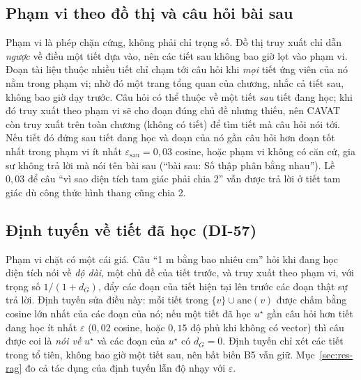 \subsection{Phạm vi theo đồ thị và câu hỏi bài sau}
Phạm vi là phép chặn cứng, không phải chỉ trọng số. Đồ thị truy xuất chỉ dẫn \emph{ngược} về điều một tiết dựa vào, nên các tiết sau không bao giờ lọt vào phạm vi. Đoạn tài liệu thuộc nhiều tiết chỉ chạm tới câu hỏi khi \emph{mọi} tiết ứng viên của nó nằm trong phạm vi; nhờ đó một trang tổng quan của chương, nhắc cả tiết sau, không bao giờ dạy trước. Câu hỏi có thể thuộc về một tiết \emph{sau} tiết đang học; khi đó truy xuất theo phạm vi sẽ cho đoạn đúng chủ đề nhưng thiếu, nên CAVAT còn truy xuất trên toàn chương (không có tiết) để tìm tiết mà câu hỏi nói tới. Nếu tiết đó đứng sau tiết đang học và đoạn của nó gần câu hỏi hơn đoạn tốt nhất trong phạm vi ít nhất $\varepsilon_{\text{sau}}=0{,}03$ cosine, hoặc phạm vi không có căn cứ, gia sư không trả lời mà nói tên bài sau (``bài sau: Số thập phân bằng nhau''). Lề $0{,}03$ để câu ``vì sao diện tích tam giác phải chia 2'' vẫn được trả lời ở tiết tam giác dù công thức hình thang cũng chia 2.

\subsection{Định tuyến về tiết đã học (DI-57)}\label{sec:routing}
Phạm vi chặt có một cái giá. Câu ``1 m bằng bao nhiêu cm'' hỏi khi đang học diện tích nói về \emph{độ dài}, một chủ đề của tiết trước, và truy xuất theo phạm vi, với trọng số $1/(1+d_G)$, đẩy các đoạn của tiết hiện tại lên trước các đoạn thật sự trả lời. Định tuyến sửa điều này: mỗi tiết trong $\{v\}\cup\mathrm{anc}(v)$ được chấm bằng cosine lớn nhất của các đoạn của nó; nếu một tiết đã học $u^\star$ gần câu hỏi hơn tiết đang học ít nhất $\varepsilon$ ($0{,}02$ cosine, hoặc $0{,}15$ độ phủ khi không có vector) thì câu được coi là \emph{nói về} $u^\star$ và các đoạn của $u^\star$ có $d_G=0$. Định tuyến chỉ xét các tiết trong tổ tiên, không bao giờ một tiết sau, nên bất biến B5 vẫn giữ. Mục~\ref{sec:res-rag} đo cả tác dụng của định tuyến lẫn độ nhạy với $\varepsilon$.

